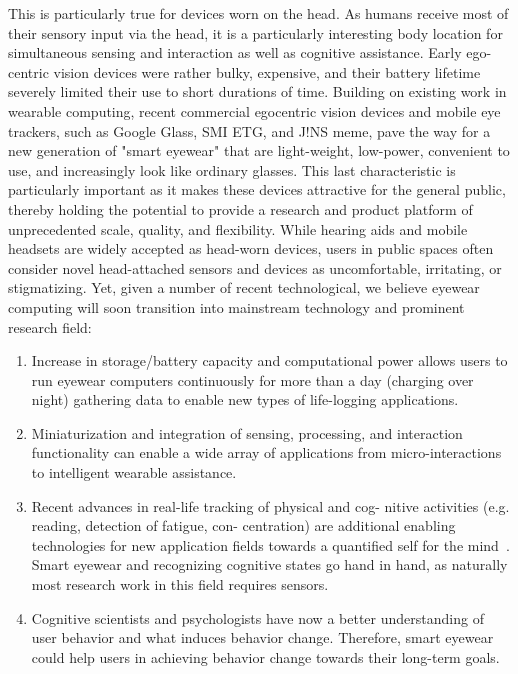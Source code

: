\documentclass{sigchi-ext}
\begin{document}
This is particularly true for devices worn on the head. As humans receive most of their sensory input via the head, it is a particularly interesting body location for simultaneous sensing and interaction as well as cognitive assistance. Early ego- centric vision devices were rather bulky, expensive, and their battery lifetime severely limited their use to short durations of time\cite{cakmakci2006head}. Building on existing work in wearable computing, recent commercial egocentric vision devices and mobile eye trackers, such as Google Glass, SMI ETG, and J!NS meme, pave the way for a new generation of "smart eyewear" that are light-weight, low-power, convenient to use, and increasingly look like ordinary glasses\cite{bulling2014cognition,kliegl2006tracking}. This last characteristic is particularly important as it makes these devices attractive for the general public, thereby holding the potential to provide a research and product platform of unprecedented scale, quality, and flexibility.
While hearing aids and mobile headsets are widely accepted as head-worn devices, users in public spaces often consider novel head-attached sensors and devices as uncomfortable, irritating, or stigmatizing. Yet, given a number of recent technological, we believe eyewear computing will soon transition into mainstream technology and prominent research field:

\begin{enumerate}
  \item Increase in storage/battery capacity and computational power allows users to run eyewear computers continuously for more than a day (charging over night) gathering data to enable new types of life-logging applications.
  \item Miniaturization and integration of sensing, processing, and interaction functionality can enable a wide array of applications from micro-interactions to intelligent wearable assistance.
  \item Recent advances in real-life tracking of physical and cog- nitive activities (e.g. reading, detection of fatigue, con- centration) are additional enabling technologies for new application fields towards a quantified self for the mind~\cite{kunze2015quantifying}. Smart eyewear and recognizing cognitive states go hand in hand, as naturally most research work in this field requires sensors.
  \item Cognitive scientists and psychologists have now a better understanding of user behavior and what induces behavior change. Therefore, smart eyewear could help users in achieving behavior change towards their long-term goals.
\end{enumerate}
\end{document}
